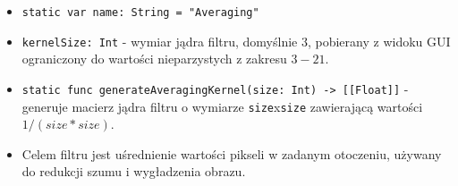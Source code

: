 \documentclass[a4paper]{article}
\begin{document}
\begin{itemize}
    \item \texttt{static var name: String = "Averaging"}
    \item \texttt{kernelSize: Int} - wymiar jądra filtru, domyślnie $3$, pobierany z widoku GUI ograniczony do wartości nieparzystych z zakresu $3-21$.
    \item \texttt{static func generateAveragingKernel(size: Int) -> [[Float]]} - generuje macierz jądra filtru o wymiarze \texttt{size}x\texttt{size} zawierającą wartości $1/(size*size)$.
    \item Celem filtru jest uśrednienie wartości pikseli w zadanym otoczeniu, używany do redukcji szumu i wygładzenia obrazu.

          \begin{figure}[H]
              \centering
              \begin{subfigure}{0.2\textwidth}
                  \centering

\end{subfigure}
\end{figure}
\end{itemize}
\end{document}
